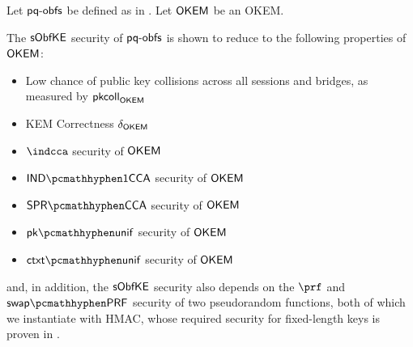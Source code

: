 \begin{theorem}
\label{thm:s-obfuscated-keyex-security}
    Let $\textsf{pq-obfs}$ be defined as in \cite[Fig. 7]{CCS:GunSteVei24}. Let $\mathsf{OKEM}$ be an OKEM.
    
    The $\mathsf{sObfKE}$ security of $\textsf{pq-obfs}$ is shown to reduce to the following properties of $\mathsf{OKEM}$:
    \begin{itemize}
        \item Low chance of public key collisions across all sessions and bridges, as measured by $\mathsf{pkcoll}_{\mathsf{OKEM}}$
        \item KEM Correctness $\delta_{\mathsf{OKEM}}$
        \item $\indcca$ security of $\mathsf{OKEM}$
        \item $\indonecca$ security of $\mathsf{OKEM}$
        \item $\sprcca$ security of $\mathsf{OKEM}$
        \item $\pkunif$ security of $\mathsf{OKEM}$
        \item $\ctxtunif$ security of $\mathsf{OKEM}$
    \end{itemize}

    and, in addition, the $\mathsf{sObfKE}$ security also depends on the $\prf$ and $\swapprf$ security of two pseudorandom functions, both of which we instantiate with HMAC, whose required security for fixed-length keys is proven in \cite{C:BBGS23}.
\end{theorem}